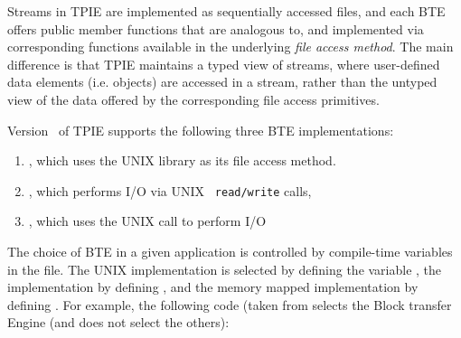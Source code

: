 
Streams in TPIE are implemented as sequentially accessed
files, and each BTE offers public member functions that are
analogous to, and implemented via corresponding functions
available in the underlying \emph{file access method}. The main
difference is that TPIE maintains a typed view of streams,
where user-defined data elements (i.e. objects) are accessed
in a stream, rather than the untyped view of the data
offered by the corresponding file
access primitives. 


Version \version~of TPIE supports the following three BTE
implementations:
\begin{enumerate}
    \item {}, which uses the
    UNIX  library as its file access method.
    
    \item {}, which performs I/O via UNIX {\tt
       read/write} calls,
    
    \item {}, which uses the UNIX
     call to perform I/O
\end{enumerate}

The choice of BTE in a given application is controlled by
compile-time variables in the  file.
The UNIX  implementation is selected by
defining the variable , the
 implementation by defining
, and the memory mapped implementation
by defining .  For example, the
following code (taken from  selects
the  Block transfer Engine (and does not
select the others):

